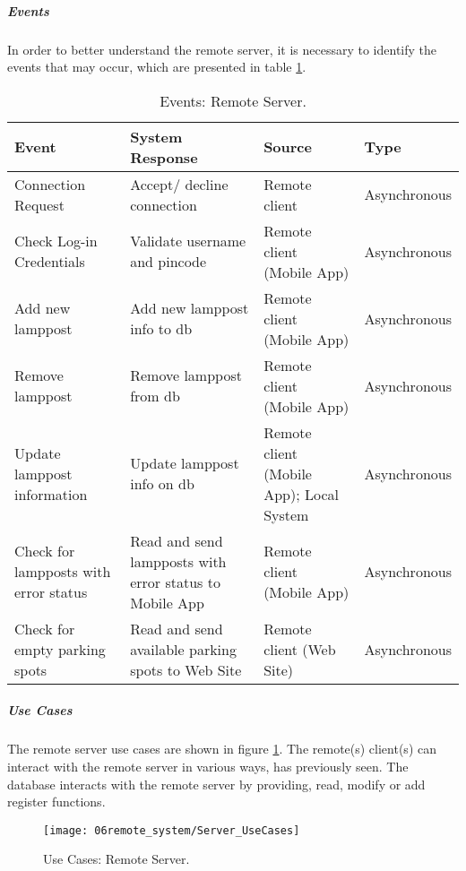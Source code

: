 \subparagraph*{Events}
In order to better understand the remote server, it is necessary to identify the events that may occur, which are presented in table \ref{table:rs_events}.

\begin{table}[ht]
	\centering
	\resizebox{\columnwidth}{!}
	{
		\begin{tabular}{|m{3cm}|m{5cm}|m{2.4cm}|m{2.4cm}|}
			\hline
			\textbf{Event} & \textbf{System Response} & \textbf{Source} & \textbf{Type}\\
			\hline\hline
	
			Connection Request & Accept/ decline connection & Remote client & Asynchronous\\\hline
			
			Check Log-in Credentials & Validate username and pincode & Remote client (Mobile App) & Asynchronous\\\hline
			
			Add new lamppost & Add new lamppost info to \ac{db} & Remote client (Mobile App) & Asynchronous\\\hline
			
			Remove lamppost & Remove lamppost from \ac{db} & Remote client (Mobile App) & Asynchronous\\\hline
			
			Update lamppost information & Update lamppost info on \ac{db} & Remote client (Mobile App); Local System & Asynchronous\\\hline
			
			Check for lampposts with error status & Read and send lampposts with error status to Mobile App & Remote client (Mobile App) &  Asynchronous\\\hline
			
			Check for empty parking spots & Read and send available parking spots to Web Site & Remote client (Web Site) & Asynchronous\\\hline
		\end{tabular}
	}
	\caption{Events: Remote Server.}
	\label{table:rs_events}
\end{table}

\subparagraph*{Use Cases}
The remote server use cases are shown in figure \ref{fig:UseCases_Server}. The remote(s) client(s) can interact with the remote server in various ways, has previously seen. The database interacts with the remote server by providing, read, modify or add register functions.

\begin{figure}[H]
	\centering
	\texttt{[image: 06remote\_system/Server\_UseCases]}
	\caption{Use Cases: Remote Server.}
	\label{fig:UseCases_Server}
\end{figure}

